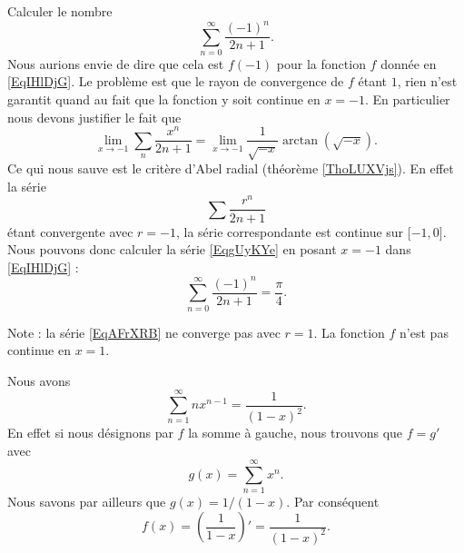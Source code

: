 \begin{example}
    Calculer le nombre
    \begin{equation}        \label{EqgUyKYe}
        \sum_{n=0}^{\infty}\frac{ (-1)^n }{ 2n+1 }.
    \end{equation}
    Nous aurions envie de dire que cela est \( f(-1)\) pour la fonction \( f\) donnée en \eqref{EqIHlDjG}. Le problème est que le rayon de convergence de \( f\) étant \( 1\), rien n'est garantit quand au fait que la fonction y soit continue en \( x=-1\). En particulier nous devons justifier le fait que
    \begin{equation}
        \lim_{x\to -1} \sum_n\frac{ x^n }{ 2n+1 }=\lim_{x\to -1} \frac{1}{ \sqrt{-x} }\arctan(\sqrt{-x}).
    \end{equation}
    Ce qui nous sauve est le critère d'Abel radial (théorème \ref{ThoLUXVjs}). En effet la série
    \begin{equation}        \label{EqAFrXRB}
        \sum\frac{ r^n }{ 2n+1 }
    \end{equation}
    étant convergente avec \( r=-1\), la série correspondante est continue sur \( \mathopen[ -1 , 0 \mathclose]\). Nous pouvons donc calculer la série \eqref{EqgUyKYe} en posant \( x=-1\) dans \eqref{EqIHlDjG} :
    \begin{equation}       
        \sum_{n=0}^{\infty}\frac{ (-1)^n }{ 2n+1 }=\frac{ \pi }{ 4 }.
    \end{equation}

    Note : la série \eqref{EqAFrXRB} ne converge pas avec \( r=1\). La fonction \( f\) n'est pas continue en \( x=1\).
\end{example}

\begin{example}     \label{ExGxzLlP}
    Nous avons
    \begin{equation}
        \sum_{n=1}^{\infty}nx^{n-1}=\frac{1}{ (1-x)^2 }.
    \end{equation}
    En effet si nous désignons par \( f\) la somme à gauche, nous trouvons que \( f=g'\) avec
    \begin{equation}
        g(x)=\sum_{n=1}^{\infty}x^n.
    \end{equation}
    Nous savons par ailleurs que \( g(x)=1/(1-x)\). Par conséquent
    \begin{equation}
        f(x)=\left( \frac{1}{ 1-x } \right)'=\frac{1}{ (1-x)^2 }.
    \end{equation}
\end{example}

